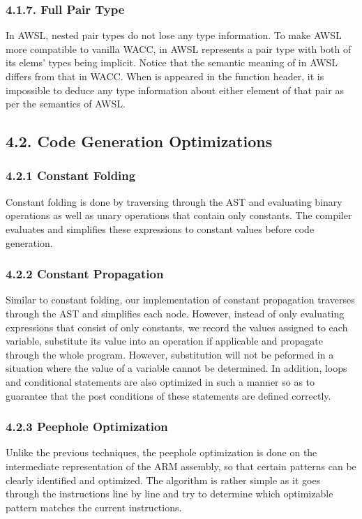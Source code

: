 \documentclass[10pt,a4paper]{report}
\begin{document}
  \subsubsection*{4.1.7. Full Pair Type}
  In AWSL, nested pair types do not lose any type information. To make AWSL more compatible to vanilla WACC,  in AWSL represents
  a pair type with both of its elems' types being implicit. Notice that the semantic meaning of  in AWSL differs from that in WACC. 
  When  is appeared in the function header, it is impossible to deduce any type information about either element of that pair as 
  per the semantics of AWSL.

  \subsection*{4.2. Code Generation Optimizations}
  \subsubsection*{4.2.1	Constant Folding}
  Constant folding is done by traversing through the AST and evaluating binary operations as well as unary operations that contain only constants.
  The compiler evaluates and simplifies these expressions to constant values before code generation.
  \subsubsection*{4.2.2	Constant Propagation}
  Similar to constant folding, our implementation of constant propagation traverses through the AST and simplifies each node. However, instead of 
  only evaluating expressions that consist of only constants, we record the values assigned to each variable, substitute its value into
  an operation if applicable and propagate through the whole program. However, substitution will not be peformed in a situation where the value of 
  a variable cannot be determined. In addition, loops and conditional statements are also optimized in such a manner so as to guarantee that the 
  post conditions of these statements are defined correctly.
  \subsubsection*{4.2.3	Peephole Optimization}
  Unlike the previous techniques, the peephole optimization is done on the intermediate representation of the ARM assembly, so that certain patterns
  can be clearly identified and optimized. The algorithm is rather simple as it goes through the instructions line by line and try to determine which 
  optimizable pattern matches the current instructions.
\end{document}
